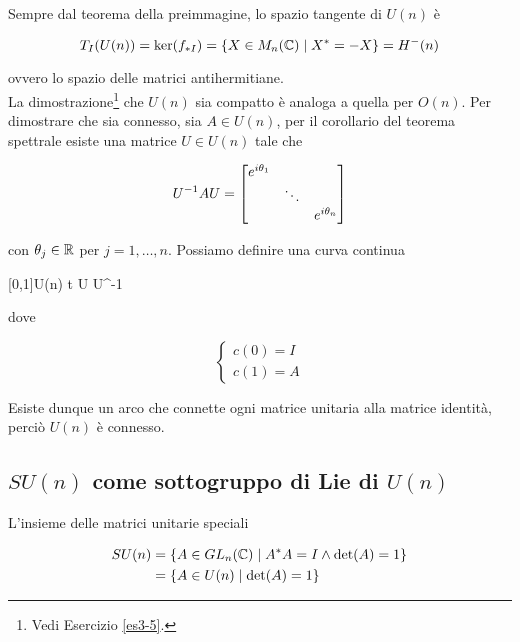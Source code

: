 Sempre dal teorema della preimmagine, lo spazio tangente di $ U(n) $ è

\begin{equation}
	T_{I}(U(n)) = \ker(f_{*I}) = \{ X \in M_{n}(\mathbb{C}) \mid X^{*} = -X \} = H^{-}(n)
\end{equation}

ovvero lo spazio delle matrici antihermitiane.\\
La dimostrazione\footnote{%
	Vedi Esercizio \ref{es3-5}.%
} che $ U(n) $ sia compatto è analoga a quella per $ O(n) $. Per dimostrare che sia connesso, sia $ A \in U(n) $, per il corollario del teorema spettrale esiste una matrice $ U \in U(n) $ tale che

\begin{equation}
	U^{-1} A U = %
	\bmqty{ %
			\dmat{ %
					e^{i \theta_{1}}, %
					\ddots, %
					e^{i \theta_{n}} %
					} %
			}
\end{equation}

con $ \theta_{j} \in \mathbb{R} $ per $ j=1,\dots,n $. Possiamo definire una curva continua

	{[0,1]}{U(n)}
	{t}{ %
			U  U^{-1} %
			}

dove

\begin{equation}
	\begin{cases}
		c(0) = I\\
		c(1) = A
	\end{cases}
\end{equation}

Esiste dunque un arco che connette ogni matrice unitaria alla matrice identità, perciò $ U(n) $ è connesso.

\subsection{$ SU(n) $ come sottogruppo di Lie di $ U(n) $}

L'insieme delle matrici unitarie speciali

\begin{align}
	\begin{split}
		SU(n) &= \{ A \in GL_{n}(\mathbb{C}) \mid A^{*} A = I \wedge \det(A) = 1 \} \\
		&= \{ A \in U(n) \mid \det(A) = 1 \}
	\end{split}
\end{align}

